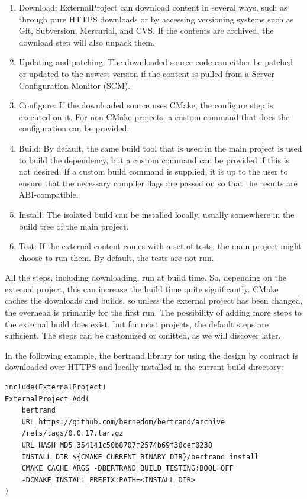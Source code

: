 \begin{enumerate}
\item 
Download: ExternalProject can download content in several ways, such as through pure HTTPS downloads or by accessing versioning systems such as Git, Subversion, Mercurial, and CVS. If the contents are archived, the download step will also unpack them.

\item 
Updating and patching: The downloaded source code can either be patched or updated to the newest version if the content is pulled from a Server Configuration Monitor (SCM).

\item 
Configure: If the downloaded source uses CMake, the configure step is executed on it. For non-CMake projects, a custom command that does the configuration can be provided.

\item 
Build: By default, the same build tool that is used in the main project is used to build the dependency, but a custom command can be provided if this is not desired. If a custom build command is supplied, it is up to the user to ensure that the necessary compiler flags are passed on so that the results are ABI-compatible.

\item 
Install: The isolated build can be installed locally, usually somewhere in the build tree of the main project.

\item 
Test: If the external content comes with a set of tests, the main project might choose to run them. By default, the tests are not run.
\end{enumerate}

All the steps, including downloading, run at build time. So, depending on the external project, this can increase the build time quite significantly. CMake caches the downloads and builds, so unless the external project has been changed, the overhead is primarily for the first run. The possibility of adding more steps to the external build does exist, but for most projects, the default steps are sufficient. The steps can be customized or omitted, as we will discover later.

In the following example, the bertrand library for using the design by contract is downloaded over HTTPS and locally installed in the current build directory:

\begin{lstlisting}[style=styleCMake]
include(ExternalProject)
ExternalProject_Add(
	bertrand
	URL https://github.com/bernedom/bertrand/archive
	/refs/tags/0.0.17.tar.gz
	URL_HASH MD5=354141c50b8707f2574b69f30cef0238
	INSTALL_DIR ${CMAKE_CURRENT_BINARY_DIR}/bertrand_install
	CMAKE_CACHE_ARGS -DBERTRAND_BUILD_TESTING:BOOL=OFF
	-DCMAKE_INSTALL_PREFIX:PATH=<INSTALL_DIR>
)
\end{lstlisting}

